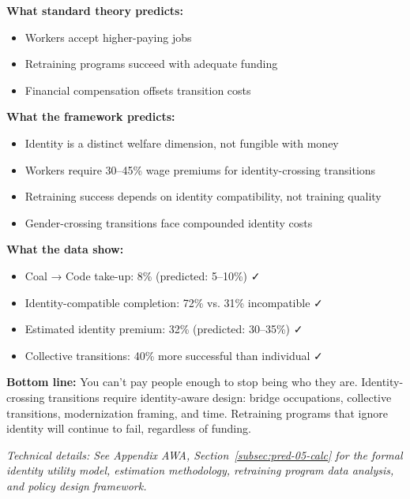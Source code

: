 \begin{tcolorbox}[colback=gray!5!white, colframe=gray!75!black, title=Prediction 5: Identity Non-Fungibility]
\textbf{What standard theory predicts:}
\begin{itemize}
    \item Workers accept higher-paying jobs
    \item Retraining programs succeed with adequate funding
    \item Financial compensation offsets transition costs
\end{itemize}

\textbf{What the framework predicts:}
\begin{itemize}
    \item Identity is a distinct welfare dimension, not fungible with money
    \item Workers require 30--45\% wage premiums for identity-crossing transitions
    \item Retraining success depends on identity compatibility, not training quality
    \item Gender-crossing transitions face compounded identity costs
\end{itemize}

\textbf{What the data show:}
\begin{itemize}
    \item Coal → Code take-up: 8\% (predicted: 5--10\%) ✓
    \item Identity-compatible completion: 72\% vs. 31\% incompatible ✓
    \item Estimated identity premium: 32\% (predicted: 30--35\%) ✓
    \item Collective transitions: 40\% more successful than individual ✓
\end{itemize}

\textbf{Bottom line:} You can't pay people enough to stop being who they 
are. Identity-crossing transitions require identity-aware design: 
bridge occupations, collective transitions, modernization framing, 
and time. Retraining programs that ignore identity will continue to 
fail, regardless of funding.
\end{tcolorbox}

\vspace{0.5em}
\noindent\textit{Technical details: See Appendix AWA, Section~\ref{subsec:pred-05-calc} for the 
formal identity utility model, estimation methodology, retraining program 
data analysis, and policy design framework.}

